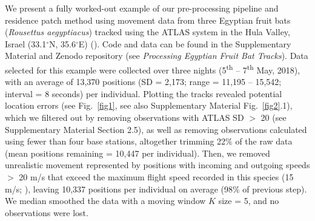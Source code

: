 \begin{refsection}[sorting=nyt]
    We present a fully worked-out example of our pre-processing pipeline and residence patch method using movement data from three Egyptian fruit bats (\textit{Rousettus aegyptiacus}) tracked using the ATLAS system in the Hula Valley, Israel (33.1$^{\circ}$N, 35.6$^{\circ}$E) (\citealt{toledo2020, lourie2021}).
    Code and data can be found in the Supplementary Material and Zenodo repository (see \textit{Processing Egyptian Fruit Bat Tracks}). 
    Data selected for this example were collected over three nights (5\textsuperscript{th} -- 7\textsuperscript{th} May, 2018), with an average of 13,370 positions (SD = 2,173; range = 11,195 -- 15,542; interval = 8 seconds) per individual.
    Plotting the tracks revealed potential location errors (see Fig.~\ref{fig1}, see also Supplementary Material Fig.~\ref{fig2}.1), which we filtered out by removing observations with ATLAS SD $>$ 20 (see Supplementary Material Section 2.5), as well as removing observations calculated using fewer than four base stations, altogether trimming 22\% of the raw data (mean positions remaining = 10,447 per individual).
    Then, we removed unrealistic movement represented by positions with incoming and outgoing speeds $>$ 20 m/s that exceed the maximum flight speed recorded in this species (15 m/s; \citealt{tsoar2011}), leaving 10,337 positions per individual on average (98\% of previous step).
    We median smoothed the data with a moving window $K$ size = 5, and no observations were lost.


\end{refsection}

